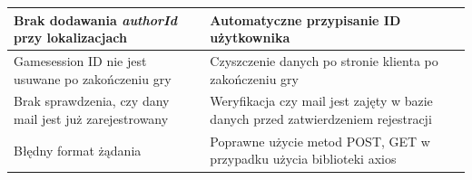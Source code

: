 \begin{table}[h!]
\begin{tabular}{|p{7cm}|p{7cm}|}
Brak dodawania \textit{authorId} przy lokalizacjach & Automatyczne przypisanie ID użytkownika \\ \hline
Gamesession ID nie jest usuwane po zakończeniu gry & Czyszczenie danych po stronie klienta po zakończeniu gry \\ \hline
Brak sprawdzenia, czy dany mail jest już zarejestrowany & Weryfikacja czy mail jest zajęty w bazie danych przed zatwierdzeniem rejestracji \\ \hline
Błędny format żądania & Poprawne użycie metod POST, GET w przypadku użycia biblioteki axios \\ \hline
\end{tabular}
\end{table}
